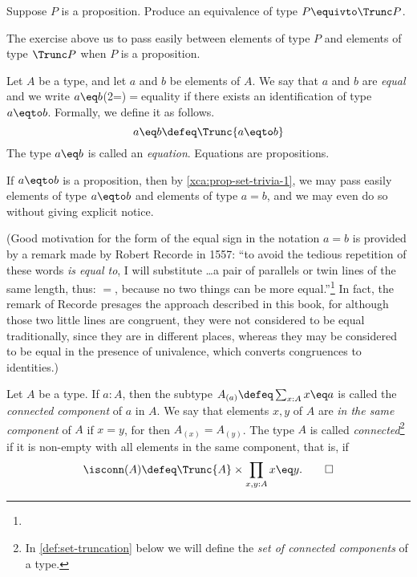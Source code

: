 \begin{xca}\label{xca:prop-set-trivia-1}
  Suppose $P$ is a proposition.  Produce an equivalence of type $P \equivto \Trunc P$.
\end{xca}

The exercise above us to pass easily between elements of type $P$ and elements of type
$\Trunc P$ when $P$ is a proposition.

\begin{definition}
  Let $A$ be a type, and let $a$ and $b$ be elements of $A$.  We say that $a$ and $b$ are \emph{equal} and
  we write $a \eq b$\glossary(2=){$=$}{equality} if there exists an identification of type $a \eqto b$.  Formally, we define it as follows.
  \[
  a \eq b \defeq \Trunc {a \eqto b}
  \]
  The type $a \eq b$ is called an \emph{equation}.  Equations are propositions.
\end{definition}

\begin{remark}
  If $a \eqto b$ is a proposition, then by \cref{xca:prop-set-trivia-1}, we may pass easily elements of type
  $a \eqto b$ and elements of type $a = b$, and we may even do so without giving explicit notice.
\end{remark}

(Good motivation for the form of the equal sign in the notation $a=b$ is provided by a remark made by Robert Recorde in 1557: ``to avoid the tedious repetition of
these words \emph{is equal to}, I will substitute \dots a pair of parallels or twin lines of the same length, thus: $=$, because no two things
can be more equal.''\footnote{}
In fact, the remark of Recorde presages the approach described in this book, for although those two little lines are congruent,
they were not considered to be equal traditionally, since they are in different places, whereas they may be considered to be equal in the presence of univalence,
which converts congruences to identities.)

\begin{definition}\label{def:connected}
  Let $A$ be a type. If $a:A$, then the subtype $A_{(a)}\defeq \sum_{x:A} x \eq a$
  is called the \emph{connected component} of $a$ in $A$.
  We say that elements $x,y$ of $A$ are \emph{in the same component} of $A$ if $x = y$, for then $A_{(x)} = A_{(y)}$.
  The type $A$ is called \emph{connected}\footnote{%
    In \cref{def:set-truncation} below we will
    define the \emph{set of connected components} of a type.}
  if it is non-empty with
  all elements in the same component, that is, if
  \[
    \isconn(A) \defeq \Trunc{A} \times \prod_{x,y:A} x \eq y.\qedhere
  \]
\end{definition}

